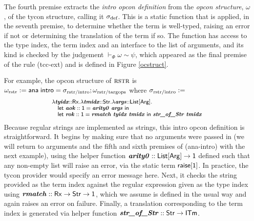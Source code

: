 \documentclass[10pt,preprint]{sigplanconf}
\begin{document}
The fourth premise extracts the \emph{intro opcon definition} from the \emph{opcon structure}, $\omega$, of the tycon structure, calling it $\sigma_\text{def}$. This is a static function that is applied, in the seventh premise, to determine whether the term is well-typed, raising an error if not or determining the translation of the term if so. The function has access to the type index, the term index and an interface to the list of arguments, and its kind is checked by the  judgement $\vdash_\Phi \omega \sim \psi$, which appeared as the final premise of the rule (tcc-ext) and is defined in Figure \ref{ocstruct}. 

For example, the opcon structure of $\textsc{rstr}$ is  $\small\omega_\text{rstr} := \tcstructn{\stx{rstr/intro}}; \omega_\text{rstr/targops}$ where $\small\stx{rstr/intro}:=$
\[\small\begin{array}{l}
    \slam{\krx}{\svar{tyidx}}{\slam{\kstr}{\svar{tmidx}}{\slam{\kargs}{\svar{args}}{\\
\quad \keyw{let}~\svar{aok} :: \kunit = \svar{arity0}~\svar{args}~\keyw{in}~\\
\quad \keyw{let}~\svar{rok} :: \kunit = \svar{rmatch}~\svar{tyidx}~\svar{tmidx}~\keyw{in}~\svar{str\_of\_Str}~\svar{tmidx}
}}}
\end{array}\]
Because regular strings are implemented as strings, this intro opcon definition is straightforward. It begins by making sure that no arguments were passed in (we will return to arguments and the fifth and sixth premises of (ana-intro) with the next example), using the helper function $\svar{arity0} :: \kargs \rightarrow \kunit$ defined such that any non-empty list will raise an error, via the static term ${\sf raise}[{\sf 1}]$. In practice, the tycon provider would specify an error message here. 
Next, it checks the string provided as the term index against the regular expression given as the type index using ${\textbf{\textit{rmatch}}} :: {\sf Rx} \rightarrow {\sf Str} \rightarrow {\sf 1}$, which we assume is defined in the usual way and again raises an error on failure. Finally, a {translation} corresponding to the term index is generated via  helper function $\svar{str\_of\_Str} :: \keyw{Str} \rightarrow \kitm$.%
\end{document}
